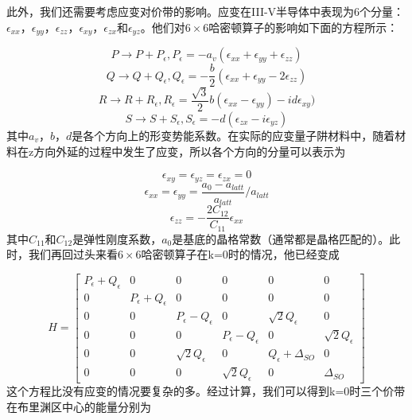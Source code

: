 \documentclass{ZJUthesis}
\begin{document}
此外，我们还需要考虑应变对价带的影响。应变在III-V半导体中表现为6个分量：$\epsilon_{xx}$，$\epsilon_{yy}$，$\epsilon_{zz}$，$\epsilon_{xy}$，$\epsilon_{zx}$和$\epsilon_{yz}$。他们对$6\times6$哈密顿算子的影响如下面的方程所示\cite{Calvin1992Spin}：

\begin{equation}
    P \rightarrow P + P_{\epsilon} ,  P_{\epsilon} = - a_v (\epsilon_{xx} + \epsilon_{yy} + \epsilon_{zz})
\end{equation}
\begin{equation}
    Q \rightarrow Q + Q_{\epsilon} ,  Q_{\epsilon} = - \frac{b}{2} (\epsilon_{xx} + \epsilon_{yy} -2 \epsilon_{zz})
\end{equation}
\begin{equation}
    R \rightarrow R + R_{\epsilon} ,  R_{\epsilon} = \frac{\sqrt{3}}{2} b (\epsilon_{xx} - \epsilon_{yy}) - i d \epsilon_{xy})
\end{equation}
\begin{equation}
    S \rightarrow S + S_{\epsilon} ,  S_{\epsilon} = - d (\epsilon_{zx} -i \epsilon_{yz})
\end{equation}
其中$a_v$，$b$，$d$是各个方向上的形变势能系数。在实际的应变量子阱材料中，随着材料在z方向外延的过程中发生了应变，所以各个方向的分量可以表示为

\begin{equation}
    \epsilon_{xy} = \epsilon_{yz} = \epsilon_{zx} = 0
\end{equation}
\begin{equation}
    \epsilon_{xx} = \epsilon_{yy} = \frac{a_0 - a_{latt}}{a_{latt}} / a_{latt}
\end{equation}
\begin{equation}
    \epsilon_{zz} = - \frac{2 C_{12}}{C_{11}}  \epsilon_{xx}
\end{equation}
其中$C_{11}$和$C_{12}$是弹性刚度系数，$a_0$是基底的晶格常数（通常都是晶格匹配的）。此时，我们再回过头来看$6\times6$哈密顿算子在k=0时的情况，他已经变成

\begin{equation}
    H = \left[\begin{array}{cccccc}P_{\epsilon}+Q_{\epsilon} & 0 & 0 & 0 & 0 & 0 \\0 & P_{\epsilon}+Q_{\epsilon} & 0 & 0 & 0 & 0 \\0 & 0 & P_{\epsilon}-Q_{\epsilon} & 0 & \sqrt{2}Q_{\epsilon} & 0 \\0 & 0 & 0 & P_{\epsilon}-Q_{\epsilon} & 0 & \sqrt{2}Q_{\epsilon} \\0 & 0 & \sqrt{2}Q_{\epsilon} & 0 & Q_{\epsilon}+\Delta_{SO} & 0 \\0 & 0 & 0 & \sqrt{2}Q_{\epsilon} & 0 & \Delta_{SO}\end{array}\right]
\end{equation}
这个方程比没有应变的情况要复杂的多。经过计算，我们可以得到k=0时三个价带在布里渊区中心的能量分别为
\end{document}
